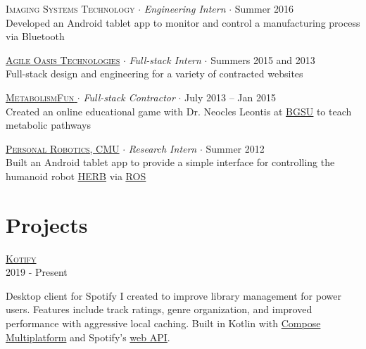 \documentclass[letterpaper,10pt]{article}
\newenvironment{lcol}
{
    \begin{minipage}[t]{.18\linewidth}
    \begin{flushright}
}
{
    \end{flushright}
    \end{minipage}
}
\newenvironment{rcol}
{
    \hspace{.005\linewidth}
    \begin{minipage}[t]{.8\linewidth}
}
{
    \end{minipage}
}
\begin{document}
\vspace{6pt}

\textsc{Imaging Systems Technology} $\cdot$ \textit{Engineering Intern} $\cdot$ Summer 2016 \\
\-\hspace{.28in} Developed an Android tablet app to monitor and control a manufacturing process via Bluetooth

\vspace{6pt}

\href{http://agileoasis.com}{\textsc{Agile Oasis Technologies}} $\cdot$ \textit{Full-stack Intern} $\cdot$ Summers 2015 and 2013 \\
\-\hspace{.28in} Full-stack design and engineering for a variety of contracted websites

\vspace{6pt}

\href{https://github.com/dzirbel/metabolism-fun}{\textsc{MetabolismFun} } $\cdot$ \textit{Full-stack Contractor} $\cdot$ July 2013 -- Jan 2015 \\
\-\hspace{.28in} Created an online educational game with Dr. Neocles Leontis at \href{https://www.bgsu.edu/}{\underline{BGSU}} to teach metabolic pathways

\vspace{6pt}

\href{https://personalrobotics.cs.washington.edu}{\textsc{Personal Robotics, CMU}} $\cdot$ \textit{Research Intern} $\cdot$ Summer 2012 \\
\-\hspace{.28in} Built an Android tablet app to provide a simple interface for controlling the humanoid robot \href{https://robotsguide.com/robots/herb}{\underline{HERB}} via \href{https://www.ros.org/}{\underline{ROS}}

\section{Projects}

\begin{lcol}
    \textsc{\href{https://github.com/dzirbel/kotify}{Kotify }} \\
    2019 - Present
\end{lcol}
\begin{rcol}
    Desktop client for Spotify I created to improve library management for power users. Features include track ratings, genre organization, and improved performance with aggressive local caching. Built in Kotlin with \href{https://www.jetbrains.com/lp/compose-multiplatform/}{Compose Multiplatform} and Spotify's \href{https://developer.spotify.com/documentation/web-api/}{web API}.
\end{rcol}
\end{document}

